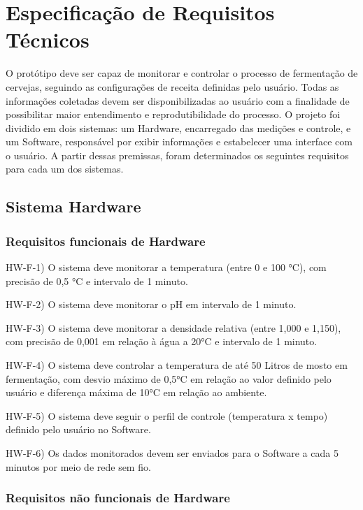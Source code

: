 \section{Especificação de Requisitos Técnicos}

O protótipo deve ser capaz de monitorar e controlar o processo de fermentação de cervejas, seguindo as configurações de receita definidas pelo usuário. 
Todas as informações coletadas devem ser disponibilizadas ao usuário com a finalidade de possibilitar maior entendimento e reprodutibilidade 
do processo. O projeto foi dividido em dois sistemas: um Hardware, encarregado das medições e controle, e um Software, responsável por exibir informações e estabelecer uma interface com o usuário. A partir dessas premissas, foram determinados os seguintes requisitos para cada um dos sistemas.

\subsection{Sistema Hardware}

\subsubsection{Requisitos funcionais de Hardware}

HW-F-1) O sistema deve monitorar a temperatura (entre 0 e 100 °C), com precisão de 0,5 °C e intervalo de 1 minuto.

HW-F-2) O sistema deve monitorar o pH em intervalo de 1 minuto.

HW-F-3) O sistema deve monitorar a densidade relativa (entre 1,000 e 1,150), com precisão de 0,001 em relação à água a 20°C e intervalo de 1 minuto.

HW-F-4) O sistema deve controlar a temperatura de até 50 Litros de mosto em fermentação, com desvio máximo de 0,5°C em relação ao valor definido pelo usuário e diferença máxima de 10°C em relação ao ambiente.

HW-F-5) O sistema deve seguir o perfil de controle (temperatura x tempo) definido pelo usuário no Software.

HW-F-6) Os dados monitorados devem ser enviados para o Software a cada 5 minutos por meio de rede sem fio.

\subsubsection{Requisitos não funcionais de Hardware}

